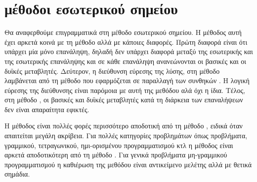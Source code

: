 \section{ μέθοδοι εσωτερικού σημείου}
Θα αναφερθούμε επιγραμματικά στη μέθοδο  εσωτερικού σημείου. Η
μέθοδος αυτή έχει αρκετά κοινά με τη μέθοδο  αλλά με κάποιες
διαφορές. Πρώτη διαφορά είναι ότι υπάρχει μία μόνο επανάληψη, δηλαδή δεν υπάρχει
διαφορά μεταξύ της εσωτερικής και της εσωτερικής επανάληψης και σε κάθε
επανάληψη ανανεώνονται οι βασικές και οι δυϊκές μεταβλητές. Δεύτερον, η
διεύθυνση εύρεσης της λύσης, στη μέθοδο  λαμβάνεται από τη
μέθοδο  που εφαρμόζεται σε παραλλαγή των συνθηκών . Η λογική
εύρεσης της διεύθυνσης είναι παρόμοια με αυτή της μεθόδου 
αλά όχι η ίδια. Τέλος, στη μέθοδο , οι βασικές και δυϊκές
μεταβλητές κατά τη διάρκεια των επαναλήψεων δεν είναι απαραίτητα εφικτές.

Η  μέθοδος είναι πολλές φορές περισσότερο αποδοτική από τη
μέθοδο , ειδικά όταν απαιτείται μεγάλη ακρίβεια. Για πολλές
κατηγορίες προβλημάτων όπως προβλήματα, γραμμικού, τετραγωνικού, ημι-ορισμένου
προγραμματισμού κτλ η μέθοδος  είναι αρκετά αποδοτικότερη από
τη μέθοδο . Για γενικά προβλήματα μη-γραμμικού
προγραμματισμού η καθιέρωση της μεθόδου είναι αντικείμενο μελέτης αλλά με
θετικά σημάδια.

